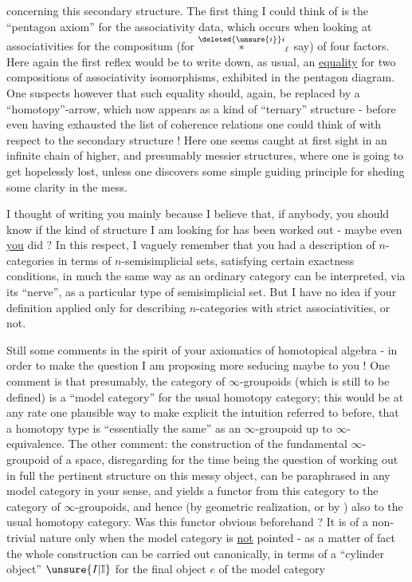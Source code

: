 concerning this secondary structure. The first thing I could think of is the ``pentagon axiom'' for the associativity data, which occurs when looking at associativities for the compositum (for $\overset{\deleted{\unsure{i}}i}{*}_\ell$ say) of four factors. Here again\deleted{\unsure{,}} the first reflex would be to write down, as usual, an \uline{equality} for  two compositions of associativity isomorphisms, exhibited in the pentagon diagram. One suspects however that such equality should, again, be replaced by a ``homotopy''-arrow, which now appears as a kind of ``ternary'' structure - before even having exhausted the list of coherence relations one could think of with respect to the secondary structure ! Here one seems caught at first sight in an infinite chain of  higher, and presumably\handwritten{,} messier structures, where one is going to get hopelessly lost, unless one discovers some simple guiding principle for sheding some clarity in the mess.

\quad I thought of writing you mainly because I believe that, if anybody, you should know if the kind of structure I am looking for has been worked out - maybe even \uline{you} did ? In this respect, I vaguely remember that you had a description of $n$-categories in terms of $n$-semisimplicial sets, satisfying certain exactness conditions, in much the same way as an ordinary category can be interpreted, via its ``nerve'', as a particular type of semisimplicial set. But I have no idea if your definition applied only for describing $n$-categories with strict associativities, or not.

Still some comments in the spirit of your axiomatics of homotopical algebra - in order to make the question I am proposing more seducing maybe to you ! One comment is that presumably, the category of $\infty$-groupoids (which is still to be defined) is a ``model category'' for the usual homotopy category; this would be at any rate one plausible way to make explicit the intuition referred to before, that a homotopy type is ``essentially the same'' as an $\infty$-groupoid up to $\infty$-equivalence. The other comment: the construction of the fundamental $\infty$-groupoid of a space, disregarding for the time being the question of working out in full the pertinent structure on this messy object, can be paraphrased in any model category in your sense, and yields a functor from this category to the category of $\infty$-groupoids, and hence (by geometric realization, or by ) also to the usual homotopy category. Was this functor obvious beforehand ? It is of a non-trivial nature only when the model category is \uline{not} pointed - as a matter of fact the whole construction can be carried out canonically, in terms of a ``cylinder object'' $\unsure{I|\mathbb{I}}$ for the final object $e$ of the model category
